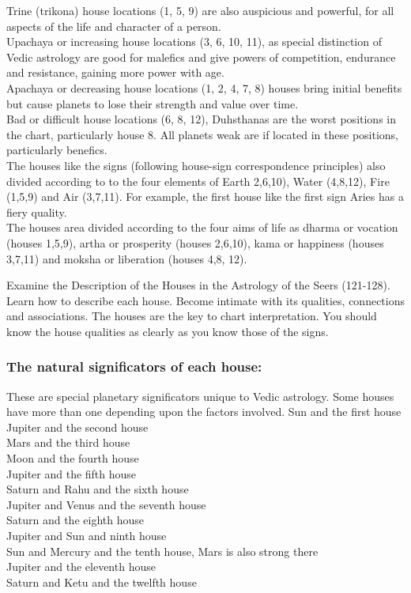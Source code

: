 Trine (trikona) house locations (1, 5, 9) are also auspicious and powerful, for all aspects of the life and character of a person.\\
Upachaya or increasing house locations (3, 6, 10, 11), as special distinction of Vedic astrology  are good for malefics and give powers of competition, endurance and resistance, gaining more power with age.\\
Apachaya or decreasing house locations (1, 2, 4, 7, 8) houses bring initial benefits but cause planets to lose their strength and value over time.\\
Bad or difficult house locations (6, 8, 12), Duhsthanas are the worst positions in the chart, particularly house 8. All planets weak are if located in these positions, particularly benefics.\\
The houses like the signs (following house-sign correspondence principles) also divided according to to the four elements of Earth 2,6,10), Water (4,8,12), Fire (1,5,9) and Air (3,7,11). For example, the first house like the first sign Aries has a fiery quality.\\
The houses area divided according to the four aims of life as dharma or vocation (houses 1,5,9), artha or prosperity (houses 2,6,10), kama or happiness (houses 3,7,11) and moksha or liberation (houses 4,8, 12).
 

Examine the Description of the Houses in the Astrology of the Seers  (121-128). Learn how to describe each house. Become intimate with its qualities, connections and associations. The houses are the key to chart interpretation. You should know the house qualities as clearly as you know those of the signs.

 

\subsubsection{The natural significators of each house:}

These are special planetary significators unique to Vedic astrology. Some houses have more than one depending upon the factors involved.
Sun and the first house\\
Jupiter and the second house\\
Mars and the third house\\
Moon and the fourth house\\
Jupiter and the fifth house\\
Saturn and Rahu and the sixth  house\\
Jupiter and Venus and the seventh house\\
Saturn and the eighth house\\
Jupiter and Sun and ninth house\\
Sun and Mercury and the tenth house, Mars is also strong there\\
Jupiter and the eleventh house\\
Saturn and Ketu and the twelfth house
 

